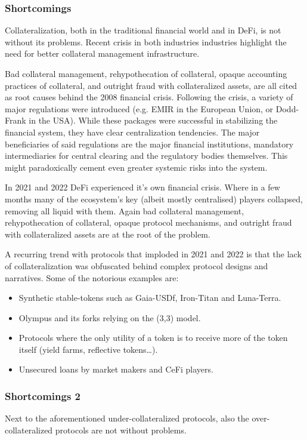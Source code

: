 \documentclass[sigconf,nonacm]{acmart}
\begin{document}
\subsubsection{Shortcomings}
Collateralization, both in the traditional financial world and in DeFi, is not without its problems.
Recent crisis in both industries industries highlight the need for better collateral management infrastructure.

Bad collateral management, rehypothecation of collateral, opaque accounting practices of collateral, and outright fraud with collateralized assets, are all cited as root causes\cite{hellwig2008causes} behind the 2008 financial crisis.
Following the crisis, a variety of major regulations were introduced (e.g. EMIR in the European Union, or Dodd-Frank in the USA).
While these packages were successful in stabilizing the financial system, they have clear centralization tendencies\cite{gregory2014central}.
The major beneficiaries of said regulations are the major financial institutions, mandatory intermediaries for central clearing and the regulatory bodies themselves.
This might paradoxically cement even greater systemic risks into the system.

In 2021 and 2022 DeFi experienced it's own financial crisis.
Where in a few months many of the ecosystem's key (albeit mostly centralised) players collapsed, removing all liquid with them.
Again bad collateral management, rehypothecation of collateral, opaque protocol mechanisms, and outright fraud with collateralized assets are at the root of the problem.

A recurring trend with protocols that imploded in 2021 and 2022 is that the lack of collateralization was obfuscated behind complex protocol designs and narratives. 
Some of the notorious examples are:
\begin{itemize}
    \item Synthetic stable-tokens such as Gaia-USDf, Iron-Titan and Luna-Terra.
    \item Olympus and its forks relying on the (3,3) model.
    \item Protocols where the only utility of a token is to receive more of the token itself (yield farms, reflective tokens…).
    \item Unsecured loans by market makers and CeFi players.
\end{itemize}

\subsubsection{Shortcomings 2}
Next to the aforementioned under-collateralized protocols, also the over-collateralized protocols are not without problems.
\end{document}
